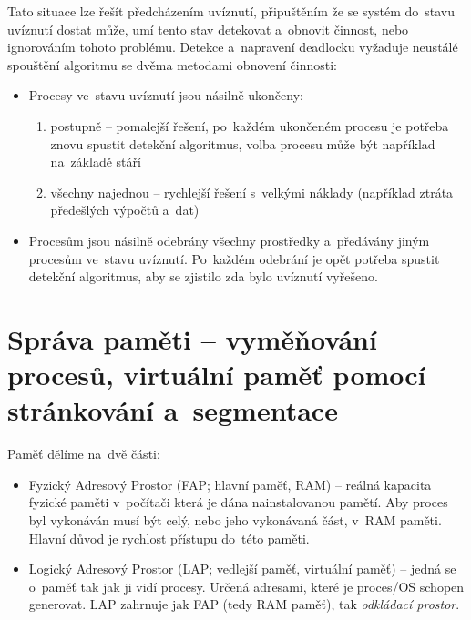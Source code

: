 Tato situace lze řešít předcházením uvíznutí, připuštěním že se systém do~stavu uvíznutí dostat může, umí tento stav detekovat a~obnovit činnost, nebo ignorováním tohoto problému. Detekce a~napravení deadlocku vyžaduje neustálé spouštění algoritmu se dvěma metodami obnovení činnosti:

\begin{itemize}
	\item Procesy ve~stavu uvíznutí jsou násilně ukončeny:
	\begin{enumerate}
		\item postupně -- pomalejší řešení, po~každém ukončeném procesu je potřeba znovu spustit detekční algoritmus, volba procesu může být například na~základě stáří
		\item všechny najednou -- rychlejší řešení s~velkými náklady (například ztráta předešlých výpočtů a~dat)
	\end{enumerate}
	
	\item Procesům jsou násilně odebrány všechny prostředky a~předávány jiným procesům ve~stavu uvíznutí. Po~každém odebrání je opět potřeba spustit detekční algoritmus, aby se zjistilo zda bylo uvíznutí vyřešeno.
\end{itemize}


\clearpage
\section{Správa paměti -- vyměňování procesů, virtuální paměť pomocí stránkování a~segmentace}

Paměť dělíme na~dvě části:
\begin{itemize}
	\item Fyzický Adresový Prostor (FAP; hlavní paměť, RAM) -- reálná kapacita fyzické paměti v~počítači která je dána nainstalovanou pamětí. Aby proces byl vykonáván musí být celý, nebo jeho vykonávaná část, v~RAM paměti. Hlavní důvod je rychlost přístupu do~této paměti.
	\item Logický Adresový Prostor (LAP; vedlejší paměť, virtuální paměť) -- jedná se o~paměť tak jak ji vidí procesy. Určená adresami, které je proces/OS schopen generovat. LAP zahrnuje jak FAP (tedy RAM paměť), tak \emph{odkládací prostor}.
\end{itemize}


